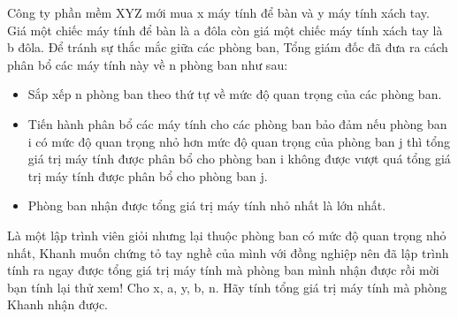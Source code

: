 Công ty phần mềm XYZ mới mua x máy tính để bàn và y máy tính xách tay. Giá một chiếc máy tính để bàn là a đôla còn giá một chiếc máy tính xách tay là b đôla. Để tránh sự thắc mắc giữa các phòng ban, Tổng giám đốc đã đưa ra cách phân bổ các máy tính này về n phòng ban như sau:  
\begin{itemize}
	\item     Sắp xếp n phòng ban theo thứ tự về mức độ quan trọng của các phòng ban.   
	\item     Tiến hành phân bổ các máy tính cho các phòng ban bảo đảm nếu phòng ban i có mức độ quan trọng nhỏ hơn mức độ quan trọng của phòng ban j thì tổng giá trị máy tính được phân bổ cho phòng ban i không được vượt quá tổng giá trị máy tính được phân bổ cho phòng ban j.   
	\item     Phòng ban nhận được tổng giá trị máy tính nhỏ nhất là lớn nhất.   
\end{itemize}

   Là một lập trình viên giỏi nhưng lại thuộc phòng ban có mức độ quan trọng nhỏ nhất, Khanh muốn chứng tỏ tay nghề của mình với đồng nghiệp nên đã lập trình tính ra ngay được tổng giá trị máy tính mà phòng ban mình nhận được rồi mời bạn tính lại thử xem!
Cho x, a, y, b, n. Hãy tính tổng giá trị máy tính mà phòng Khanh nhận được.